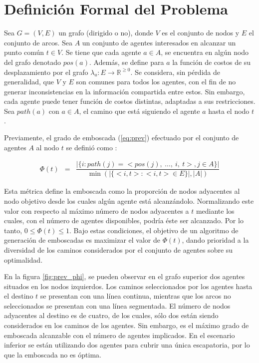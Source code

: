 \section{Definici\'on Formal del Problema}
\label{sec:definition}

Sea $G = (V,E)$ un grafo (dirigido o no), donde $V$ es el conjunto de
nodos y $E$ el conjunto de arcos. Sea $A$ un conjunto de agentes
interesados en alcanzar un punto com\'un $t \in V$. Se tiene
que cada agente $a \in A$, se encuentra en algún nodo del grafo
denotado $pos(a)$. Además, se define para $a$ la función
de costos de su desplazamiento por el grafo
$\lambda_a : E \longrightarrow \mathbb{R}^{\geq 0}$.
Se considera, sin pérdida de generalidad, que $V$ y $E$ son comunes para
todos los agentes, con el fin de no generar inconsistencias en la
información compartida entre estos. Sin embargo, cada agente puede tener
función de costos distintas, adaptadas a sus restricciones.
Sea $path(a)$ con $a \in A$, el camino que está siguiendo el agente
$a$ hasta el nodo $t$.

Previamente, el grado de emboscada (\ref{eq:prev})
efectuado por el conjunto de agentes
$A$ al nodo $t$ se defini\'o como \cite{FGC12e}\cite{FGC12}:

\begin{small}
\begin{eqnarray}
 \Phi(t) &=& 
 \dfrac{|\{ i : path(j) = <pos(j),\ \ldots,\ i,\ t>, j \in A\}|}
	  {\min(|\{ <i,t> : <i,t> \in E \} |,|A|) }
\label{eq:prev}
\end{eqnarray}
\end{small}

Esta m\'etrica define la emboscada como la proporción de nodos adyacentes
al nodo objetivo desde los cuales algún agente está alcanzándolo. Normalizando
este valor con res\-pec\-to al m\'aximo n\'umero de nodos adyacentes a $t$ mediante
los cuales, con el n\'umero de agentes disponibles, podr\'ia \'este ser alcanzado.
Por lo tanto, $0 \leq \Phi(t) \leq 1$. Bajo estas condiciones, el objetivo
de un algoritmo de generaci\'on de emboscadas es maximizar el
valor de $\Phi(t)$, dando prioridad a la diversidad de los caminos
considerados por el conjunto de agentes sobre su optimalidad.

En la figura \ref{fig:prev_phi}, se pueden observar en el grafo
superior dos agentes situados en los nodos izquierdos. Los caminos
seleccionados por los agentes hasta el destino $t$ se presentan con
una l\'inea continua, mientras que los arcos no seleccionados se
presentan con una l\'inea segmentada. El n\'umero de nodos adyacentes
al destino es de cuatro, de los cuales, s\'olo dos están siendo
considerados en los caminos de los agentes. Sin embargo, es el m\'aximo
grado de emboscada alcanzable con el n\'umero de agentes implicados.
En el escenario inferior se est\'an utilizando dos agentes para cubrir
una \'unica escapatoria, por lo que la emboscada no es \'optima.

